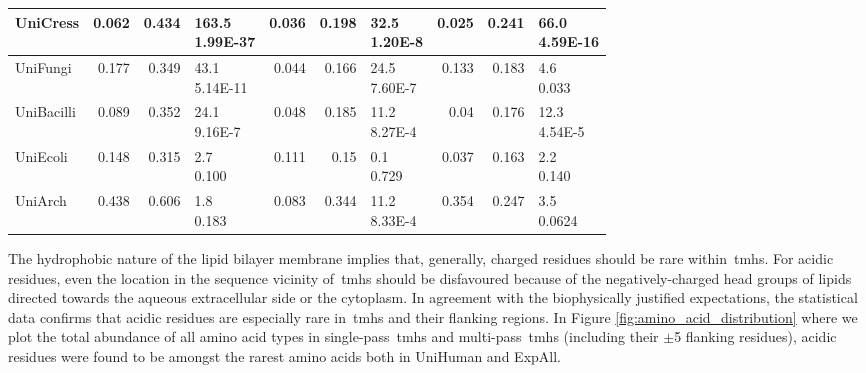 \begin{table}[htbp]
{\begin{tabular}{p{5em}rrp{5em}rrp{5em}rrp{5em}}
    \midrule
    UniCress & 0.062 & 0.434 & \specialcell{163.5 \\ 1.99E-37} & 0.036 & 0.198 & \specialcell{32.5 \\ 1.20E-8} & 0.025 & 0.241 & \specialcell{66.0 \\ 4.59E-16} \\
    \midrule
    UniFungi & 0.177 & 0.349 & \specialcell{43.1 \\ 5.14E-11} & 0.044 & 0.166 & \specialcell{24.5 \\ 7.60E-7} & 0.133 & 0.183 & \specialcell{4.6 \\ 0.033 }\\
    \midrule
    UniBacilli & 0.089 & 0.352 & \specialcell{24.1 \\ 9.16E-7} & 0.048 & 0.185 & \specialcell{11.2 \\ 8.27E-4} & 0.04  & 0.176 & \specialcell{12.3 \\ 4.54E-5} \\
    \midrule
    UniEcoli & 0.148 & 0.315 & \specialcell{2.7 \\ 0.100} & 0.111 & 0.15  & \specialcell{0.1 \\ 0.729 }& 0.037 & 0.163 & \specialcell{2.2 \\ 0.140 }\\
    \midrule
    UniArch & 0.438 & 0.606 & \specialcell{1.8 \\ 0.183} & 0.083 & 0.344 & \specialcell{11.2 \\ 8.33E-4} & 0.354 & 0.247 & \specialcell{3.5 \\ 0.0624 }\\
    \bottomrule
   \end{tabular}}%
   \label{table:acidicresiduesarerare}

\end{table}%

The hydrophobic nature of the lipid bilayer membrane implies that, generally, charged residues should be rare within~\gls{tmh}s.
For acidic residues, even the location in the sequence vicinity of~\gls{tmh}s should be disfavoured because of the negatively\--charged head groups of lipids directed towards the aqueous extracellular side or the cytoplasm.
In agreement with the biophysically justified expectations, the statistical data confirms that acidic residues are especially rare in~\gls{tmh}s and their flanking regions.
In Figure \ref{fig:amino_acid_distribution} where we plot the total abundance of all amino acid types in single\--pass~\gls{tmh}s and multi\--pass~\gls{tmh}s (including their $\pm$5 flanking residues), acidic residues were found to be amongst the rarest amino acids both in UniHuman and ExpAll.

